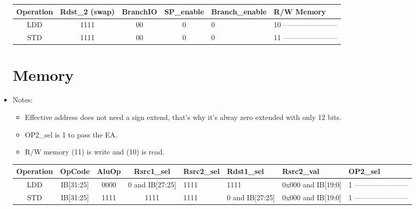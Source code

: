 \documentclass[12pt]{report}
\begin{document}
\begin{itemize}
\begin{center}
\begin{tabular}{||c| c| c| c| p{40mm}||}
        \end{tabular}
        \end{center}

        \begin{center}
        \begin{tabular}{||c| c| c| c| p{40mm}||} 
        \hline
        Operation & Rdst_2 (swap) & BranchIO & SP_enable & Branch_enable & R/W Memory  \\ [0.5ex] 
        \hline\hline
        LDD & 1111 & 00 & 0 & 0 & 10 ----------------------- \\
        \hline
        STD & 1111 & 00 & 0 & 0 & 11 ----------------------- \\
        \hline

        \end{tabular}
        \end{center}


        
        \section{Memory}
        \item Notes:
        \begin{itemize}
            \item Effective address does not need a sign extend, that's why it's alway zero extended with only 12 bits.
            \item OP2_sel is 1 to pass the EA.
            \item R/W memory (11) is write and (10) is read.
        \end{itemize}

        \begin{center}
        \begin{tabular}{||c| c| c| c| p{40mm}||} 
        \hline
        Operation & OpCode & AluOp & Rsrc1_sel & Rsrc2_sel & Rdst1_sel & Rsrc2_val & OP2_sel  \\ [0.5ex] 
        \hline\hline
        LDD& IB[31:25] & 0000 & 0 and IB[27:25] & 1111 & 1111 & 0x000 and IB[19:0] & 1 ----------------------- \\
        \hline
        STD& IB[31:25] & 1111 & 1111 & 1111 & 0 and IB[27:25] & 0x000 and IB[19:0] & 1 ----------------------- \\
        \hline


\end{tabular}
\end{center}
\end{itemize}
\end{document}
